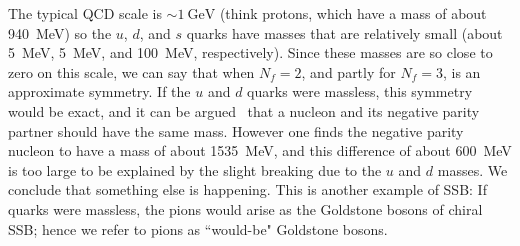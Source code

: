 The typical QCD scale is $\sim1~\text{GeV}$ (think protons, which have a
mass of about 940~MeV) so the $u$, $d$, and $s$ quarks have masses that
are relatively small (about 5~MeV, 5~MeV, and 100~MeV, respectively).
Since these masses are so close to zero on this scale, we can say that
when $N_f=2$, and partly for $N_f=3$,  is
an approximate symmetry. If the $u$ and $d$ quarks were massless, this symmetry
would be exact, and it can be argued~\cite{gattringer_quantum_2010} that
a nucleon and its negative parity partner should have the same mass.
However one finds the negative parity nucleon to have
a mass of about 1535~MeV, and this difference of about 600~MeV is too large to
be explained by the slight breaking due to the $u$ and $d$ masses. We
conclude that something else is happening. This is another example
of SSB: If quarks were massless, the pions would arise as
the Goldstone bosons of chiral SSB; hence we refer to pions as
``would-be" Goldstone bosons.




